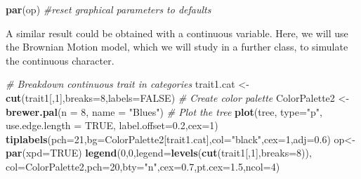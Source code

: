 \documentclass[
]{book}
\newenvironment{Shaded}{\begin{snugshade}}{\end{snugshade}}
\newcommand{\AttributeTok}[1]{\textcolor[rgb]{0.13,0.29,0.53}{#1}}
\newcommand{\CommentTok}[1]{\textcolor[rgb]{0.56,0.35,0.01}{\textit{#1}}}
\newcommand{\ConstantTok}[1]{\textcolor[rgb]{0.56,0.35,0.01}{#1}}
\newcommand{\DecValTok}[1]{\textcolor[rgb]{0.00,0.00,0.81}{#1}}
\newcommand{\FloatTok}[1]{\textcolor[rgb]{0.00,0.00,0.81}{#1}}
\newcommand{\FunctionTok}[1]{\textcolor[rgb]{0.13,0.29,0.53}{\textbf{#1}}}
\newcommand{\NormalTok}[1]{#1}
\newcommand{\OtherTok}[1]{\textcolor[rgb]{0.56,0.35,0.01}{#1}}
\newcommand{\StringTok}[1]{\textcolor[rgb]{0.31,0.60,0.02}{#1}}
\begin{document}
\begin{Shaded}
\begin{Highlighting}[]
\FunctionTok{par}\NormalTok{(op) }\CommentTok{\#reset graphical parameters to defaults}
\end{Highlighting}
\end{Shaded}

A similar result could be obtained with a continuous variable. Here, we will use the Brownian Motion model, which we will study in a further class, to simulate the continuous character.

\begin{Shaded}
\begin{Highlighting}[]
\CommentTok{\# Breakdown continuous trait in categories}
\NormalTok{trait1.cat }\OtherTok{\textless{}{-}} \FunctionTok{cut}\NormalTok{(trait1[,}\DecValTok{1}\NormalTok{],}\AttributeTok{breaks=}\DecValTok{8}\NormalTok{,}\AttributeTok{labels=}\ConstantTok{FALSE}\NormalTok{)}
\CommentTok{\# Create color palette}
\NormalTok{ColorPalette2 }\OtherTok{\textless{}{-}} \FunctionTok{brewer.pal}\NormalTok{(}\AttributeTok{n =} \DecValTok{8}\NormalTok{, }\AttributeTok{name =} \StringTok{"Blues"}\NormalTok{)}
\CommentTok{\# Plot the tree}
\FunctionTok{plot}\NormalTok{(tree, }\AttributeTok{type=}\StringTok{"p"}\NormalTok{, }\AttributeTok{use.edge.length =} \ConstantTok{TRUE}\NormalTok{, }\AttributeTok{label.offset=}\FloatTok{0.2}\NormalTok{,}\AttributeTok{cex=}\DecValTok{1}\NormalTok{)}
\FunctionTok{tiplabels}\NormalTok{(}\AttributeTok{pch=}\DecValTok{21}\NormalTok{,}\AttributeTok{bg=}\NormalTok{ColorPalette2[trait1.cat],}\AttributeTok{col=}\StringTok{"black"}\NormalTok{,}\AttributeTok{cex=}\DecValTok{1}\NormalTok{,}\AttributeTok{adj=}\FloatTok{0.6}\NormalTok{)}
\NormalTok{op}\OtherTok{\textless{}{-}}\FunctionTok{par}\NormalTok{(}\AttributeTok{xpd=}\ConstantTok{TRUE}\NormalTok{)}
\FunctionTok{legend}\NormalTok{(}\DecValTok{0}\NormalTok{,}\DecValTok{0}\NormalTok{,}\AttributeTok{legend=}\FunctionTok{levels}\NormalTok{(}\FunctionTok{cut}\NormalTok{(trait1[,}\DecValTok{1}\NormalTok{],}\AttributeTok{breaks=}\DecValTok{8}\NormalTok{)),}
       \AttributeTok{col=}\NormalTok{ColorPalette2,}\AttributeTok{pch=}\DecValTok{20}\NormalTok{,}\AttributeTok{bty=}\StringTok{"n"}\NormalTok{,}\AttributeTok{cex=}\FloatTok{0.7}\NormalTok{,}\AttributeTok{pt.cex=}\FloatTok{1.5}\NormalTok{,}\AttributeTok{ncol=}\DecValTok{4}\NormalTok{)}
\end{Highlighting}
\end{Shaded}
\end{document}
